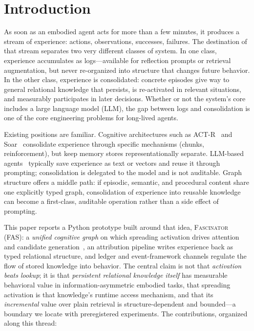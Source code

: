 \documentclass[10pt,a4paper]{article}
\begin{document}
\section{Introduction}
\label{sec:intro}

As soon as an embodied agent acts for more than a few minutes, it produces a stream of experience: actions, observations, successes, failures. The destination of that stream separates two very different classes of system. In one class, experience accumulates as logs---available for reflection prompts or retrieval augmentation, but never re-organized into structure that changes future behavior. In the other class, experience is consolidated: concrete episodes give way to general relational knowledge that persists, is re-activated in relevant situations, and measurably participates in later decisions. Whether or not the system's core includes a large language model (LLM), the gap between logs and consolidation is one of the core engineering problems for long-lived agents.

Existing positions are familiar. Cognitive architectures such as ACT-R~\citep{anderson2004integrated} and Soar~\citep{laird2012soar} consolidate experience through specific mechanisms (chunks, reinforcement), but keep memory stores representationally separate. LLM-based agents~\citep{yao2023react,park2023generative,shinn2023reflexion} typically save experience as text or vectors and reuse it through prompting; consolidation is delegated to the model and is not auditable. Graph structure offers a middle path: if episodic, semantic, and procedural content share one explicitly typed graph, consolidation of experience into reusable knowledge can become a first-class, auditable operation rather than a side effect of prompting.

This paper reports a Python prototype built around that idea, \textsc{Fascinator} (FAS): a \emph{unified cognitive graph} on which spreading activation drives attention and candidate generation~\citep{collins1975spreading}, an attribution pipeline writes experience back as typed relational structure, and ledger and event-framework channels regulate the flow of stored knowledge into behavior. The central claim is not that \emph{activation beats lookup}; it is that \emph{persistent relational knowledge itself} has measurable behavioral value in information-asymmetric embodied tasks, that spreading activation is that knowledge's runtime access mechanism, and that its \emph{incremental} value over plain retrieval is structure-dependent and bounded---a boundary we locate with preregistered experiments. The contributions, organized along this thread:
\end{document}
